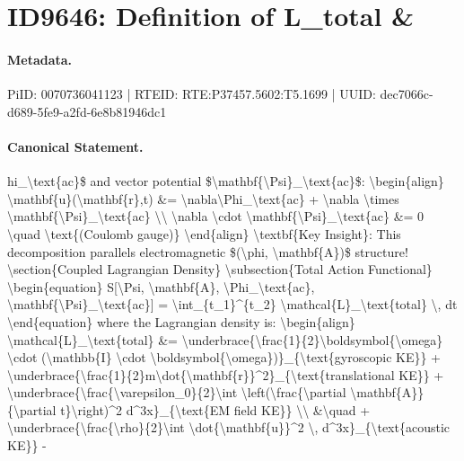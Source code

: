 \section*{ID9646: Definition of L\_total \&}
\paragraph{Metadata.}
PiID: 0070736041123 | RTEID: RTE:P37457.5602:T5.1699 | UUID: dec7066c-d689-5fe9-a2fd-6e8b81946dc1

\paragraph{Canonical Statement.}
hi\_\textbackslash{}text\{ac\}\$ and vector potential \$\textbackslash{}mathbf\{\textbackslash{}Psi\}\_\textbackslash{}text\{ac\}\$: \textbackslash{}begin\{align\} \textbackslash{}mathbf\{u\}(\textbackslash{}mathbf\{r\},t) \&= \textbackslash{}nabla\textbackslash{}Phi\_\textbackslash{}text\{ac\} + \textbackslash{}nabla \textbackslash{}times \textbackslash{}mathbf\{\textbackslash{}Psi\}\_\textbackslash{}text\{ac\} \textbackslash{}\textbackslash{} \textbackslash{}nabla \textbackslash{}cdot \textbackslash{}mathbf\{\textbackslash{}Psi\}\_\textbackslash{}text\{ac\} \&= 0 \textbackslash{}quad \textbackslash{}text\{(Coulomb gauge)\} \textbackslash{}end\{align\} \textbackslash{}textbf\{Key Insight\}: This decomposition parallels electromagnetic \$(\textbackslash{}phi, \textbackslash{}mathbf\{A\})\$ structure! \textbackslash{}section\{Coupled Lagrangian Density\} \textbackslash{}subsection\{Total Action Functional\} \textbackslash{}begin\{equation\} S[\textbackslash{}Psi, \textbackslash{}mathbf\{A\}, \textbackslash{}Phi\_\textbackslash{}text\{ac\}, \textbackslash{}mathbf\{\textbackslash{}Psi\}\_\textbackslash{}text\{ac\}] = \textbackslash{}int\_\{t\_1\}\textasciicircum{}\{t\_2\} \textbackslash{}mathcal\{L\}\_\textbackslash{}text\{total\} \textbackslash{}, dt \textbackslash{}end\{equation\} where the Lagrangian density is: \textbackslash{}begin\{align\} \textbackslash{}mathcal\{L\}\_\textbackslash{}text\{total\} \&= \textbackslash{}underbrace\{\textbackslash{}frac\{1\}\{2\}\textbackslash{}boldsymbol\{\textbackslash{}omega\} \textbackslash{}cdot (\textbackslash{}mathbb\{I\} \textbackslash{}cdot \textbackslash{}boldsymbol\{\textbackslash{}omega\})\}\_\{\textbackslash{}text\{gyroscopic KE\}\} + \textbackslash{}underbrace\{\textbackslash{}frac\{1\}\{2\}m\textbackslash{}dot\{\textbackslash{}mathbf\{r\}\}\textasciicircum{}2\}\_\{\textbackslash{}text\{translational KE\}\} + \textbackslash{}underbrace\{\textbackslash{}frac\{\textbackslash{}varepsilon\_0\}\{2\}\textbackslash{}int \textbackslash{}left(\textbackslash{}frac\{\textbackslash{}partial \textbackslash{}mathbf\{A\}\}\{\textbackslash{}partial t\}\textbackslash{}right)\textasciicircum{}2 d\textasciicircum{}3x\}\_\{\textbackslash{}text\{EM field KE\}\} \textbackslash{}\textbackslash{} \&\textbackslash{}quad + \textbackslash{}underbrace\{\textbackslash{}frac\{\textbackslash{}rho\}\{2\}\textbackslash{}int \textbackslash{}dot\{\textbackslash{}mathbf\{u\}\}\textasciicircum{}2 \textbackslash{}, d\textasciicircum{}3x\}\_\{\textbackslash{}text\{acoustic KE\}\} - 